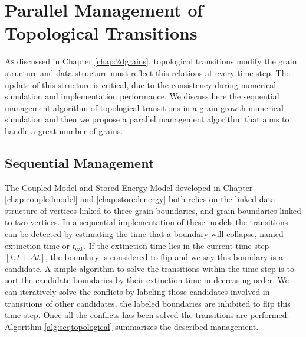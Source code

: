 \chapter{Parallel Management of Topological Transitions}
\label{chap:parallelflip}

\lettrine{A}{s} discussed in Chapter \ref{chap:2dgrains}, topological transitions modify the grain structure and data structure must reflect this relations at every time step. The update of this structure is critical, due to the consistency during numerical simulation and implementation performance. We discuss here the sequential management algorithm of topological transitions in a grain growth numerical simulation and then we propose a parallel management algorithm that aims to handle a great number of grains.

\section{Sequential Management}

The Coupled Model and Stored Energy Model developed in Chapter \ref{chap:coupledmodel} and \ref{chap:storedenergy} both relies on the linked data structure of vertices linked to three grain boundaries, and grain boundaries linked to two vertices. In a sequential implementation of these models the transitions can be detected by estimating the time that a boundary will collapse, named extinction time or $t_{\text{ext}}$. If the extinction time lies in the current time step $[t, t + \Delta t]$, the boundary is considered to flip and we say this boundary is a candidate. A simple algorithm to solve the transitions within the time step is to sort the candidate boundaries by their extinction time in decreasing order. We can iteratively solve the conflicts by labeling those candidates involved in transitions of other candidates, the labeled boundaries are inhibited to flip this time step. Once all the conflicts has been solved the transitions are performed. Algorithm \ref{alg:seqtopological} summarizes the described management.

